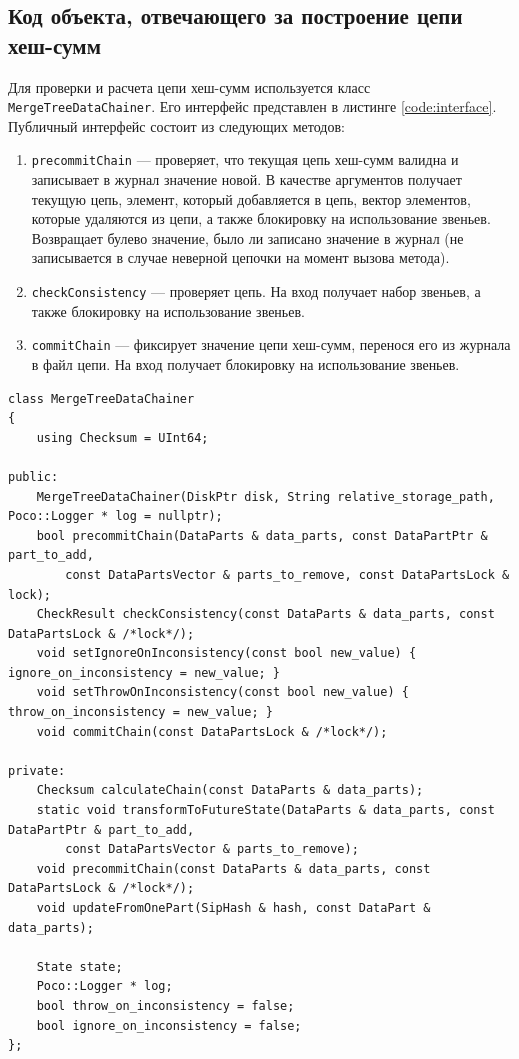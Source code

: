 \subsection{Код объекта, отвечающего за построение цепи хеш-сумм}

Для проверки и расчета цепи хеш-сумм используется класс \\ \texttt{MergeTreeDataChainer}. Его интерфейс представлен в листинге \ref{code:interface}. Публичный интерфейс состоит из следующих методов:
\begin{enumerate}
    \item \texttt{precommitChain} --- проверяет, что текущая цепь хеш-сумм валидна и записывает в журнал значение новой. В качестве аргументов получает текущую цепь, элемент, который добавляется в цепь, вектор элементов, которые удаляются из цепи, а также блокировку на использование звеньев. Возвращает булево значение, было ли записано значение в журнал (не записывается в случае неверной цепочки на момент вызова метода).
    \item \texttt{checkConsistency} --- проверяет цепь. На вход получает набор звеньев, а также блокировку на использование звеньев.
    \item \texttt{commitChain} --- фиксирует значение цепи хеш-сумм, перенося его из журнала в файл цепи. На вход получает блокировку на использование звеньев.
\end{enumerate}

\pagebreak

\begin{lstlisting}[label=code:interface, caption={Класс \texttt{MergeTreeDataChainer}.}]
class MergeTreeDataChainer
{
    using Checksum = UInt64;

public:
    MergeTreeDataChainer(DiskPtr disk, String relative_storage_path, Poco::Logger * log = nullptr);
    bool precommitChain(DataParts & data_parts, const DataPartPtr & part_to_add,
        const DataPartsVector & parts_to_remove, const DataPartsLock & lock);
    CheckResult checkConsistency(const DataParts & data_parts, const DataPartsLock & /*lock*/);
    void setIgnoreOnInconsistency(const bool new_value) { ignore_on_inconsistency = new_value; }
    void setThrowOnInconsistency(const bool new_value) { throw_on_inconsistency = new_value; }
    void commitChain(const DataPartsLock & /*lock*/);

private:
    Checksum calculateChain(const DataParts & data_parts);
    static void transformToFutureState(DataParts & data_parts, const DataPartPtr & part_to_add,
        const DataPartsVector & parts_to_remove);
    void precommitChain(const DataParts & data_parts, const DataPartsLock & /*lock*/);
    void updateFromOnePart(SipHash & hash, const DataPart & data_parts);

    State state;
    Poco::Logger * log;
    bool throw_on_inconsistency = false;
    bool ignore_on_inconsistency = false;
};
\end{lstlisting}

